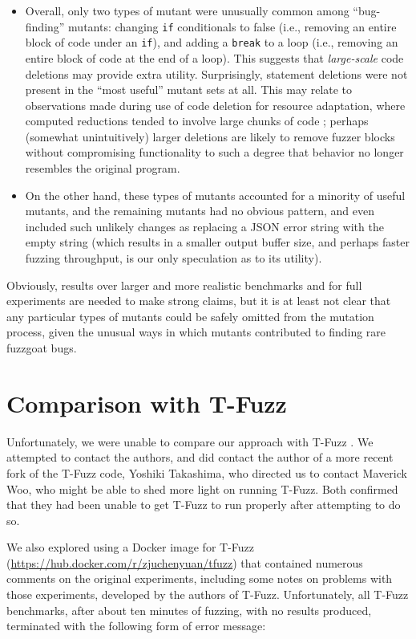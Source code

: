 \begin{itemize}
\item Overall, only two types of mutant were unusually common among ``bug-finding'' mutants: changing {\tt if} conditionals to false (i.e., removing an entire block of code under an {\tt if}), and adding a {\tt break} to a loop (i.e., removing an entire block of code at the end of a loop).  This suggests that \emph{large-scale} code deletions may provide extra utility.  Surprisingly, statement deletions were not present in the ``most useful'' mutant sets at all.  This may relate to observations made during use of code deletion for resource adaptation, where computed reductions tended to involve large chunks of code \cite{sasomin}; perhaps (somewhat unintuitively) larger deletions are likely to remove fuzzer blocks without compromising functionality to such a degree that behavior no longer resembles the original program.
\item On the other hand, these types of mutants accounted for a minority of useful mutants, and the remaining mutants had no obvious pattern, and even included such unlikely changes as replacing a JSON error string with the empty string (which results in a smaller output buffer size, and perhaps faster fuzzing throughput, is our only speculation as to its utility).
\end{itemize}

Obviously, results over larger and more realistic benchmarks and for full experiments are needed to make strong claims, but it is at least not clear that any particular types of mutants could be safely omitted from the mutation process, given the unusual ways in which mutants contributed to finding rare fuzzgoat bugs.

\section{Comparison with T-Fuzz}

\label{sec:tfuzzfail}

Unfortunately, we were unable to compare our approach with T-Fuzz \cite{tfuzz}.  We attempted to contact the authors, and did contact the author of a more recent fork of the T-Fuzz code, Yoshiki Takashima, who directed us to contact Maverick Woo, who might be able to shed more light on running T-Fuzz.  Both confirmed that they had been unable to get T-Fuzz to run properly after attempting to do so.

We also explored using a Docker image for T-Fuzz (\url{https://hub.docker.com/r/zjuchenyuan/tfuzz}) that contained numerous comments on the original experiments, including some notes on problems with those experiments, developed by the authors of T-Fuzz.  Unfortunately, all T-Fuzz benchmarks, after about ten minutes of fuzzing, with no results produced, terminated with the following form of error message:

